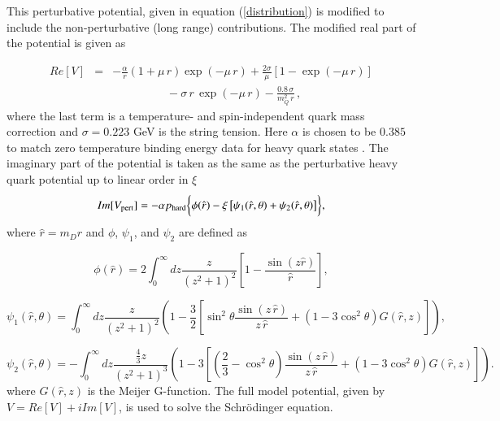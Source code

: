 {{This perturbative potential, given in equation (\ref{distribution}) is modified to include the non-perturbative (long range) contributions. 
The modified real part of the potential is given as~\cite{Dumitru:2007hy} 


%
\begin{eqnarray} 
\label{eq:repot}
Re[V] &=& -\frac{\alpha}{r} \left(1+\mu \, r\right) \exp\left( -\mu
\, r  \right) + \frac{2\sigma}{\mu}\left[1-\exp\left( -\mu
\, r  \right)\right] \nonumber \\
&& \hspace{2cm} - \sigma \,r\, \exp(-\mu\,r)- \frac{0.8 \, \sigma}{m_Q^2\, r} \, ,
\end{eqnarray}
%
where the last term is a temperature- and spin-independent quark mass correction 
\cite{Bali:1997am} and $\sigma = 0.223$ GeV is the string tension.  Here  $\alpha$ 
is chosen to be  $0.385$ 
to match zero temperature
binding energy data for heavy quark states \cite{Dumitru:2007hy}.
The imaginary part of the potential is taken as the same as the perturbative heavy quark
potential up to linear order in $\xi$ 
%
\begin{equation} 
Im[V_{\rm pert}] = -\alpha p_{\rm hard} \biggl\{ \phi(\hat{r}) - \xi \left[\psi_1(\hat{r},
\theta)+\psi_2(\hat{r}, \theta)\right]\biggr\} ,
\label{eq:impot}
\end{equation}
%
where $\hat{r}=m_D r$ and $\phi$, $\psi_1$, and $\psi_2$ are defined as


\begin{equation}
\phi(\hat{r}) = 2\int_{0}^{\infty} dz \frac{z}{(z^2+1)^2}\left[1-\frac{\sin\left(z\hat{r}\right)}{\hat{r}}\right],
\end{equation}

\begin{equation}
 \psi_1(\hat{r}, \theta) = \int_0^{\infty} dz
 \frac{z}{(z^2+1)^2}\left(1-\frac{3}{2}
 \left[\sin^2\theta\frac{\sin(z\, \hat{r})}{z\, \hat{r}}
 +(1-3\cos^2\theta)G(\hat{r}, z)\right]\right),
 \end{equation}

 \begin{equation}
 \psi_2(\hat{r}, \theta) = - \int_0^{\infty} dz
\frac{\frac{4}{3}z}{(z^2+1)^3}\left(1-3 \left[
  \left(\frac{2}{3}-\cos^2\theta \right) \frac
 {\sin(z\, \hat{r})}{z\, \hat{r}}+(1-3\cos^2\theta)
 G(\hat{r},z)\right]\right).
\label{eq:psis}
\end{equation}
where $G(\hat{r},z)$ is the Meijer G-function. The full model potential, given by $V = Re[V] + i Im[V]$, is used to 
solve the Schr\"odinger equation. 


}}
